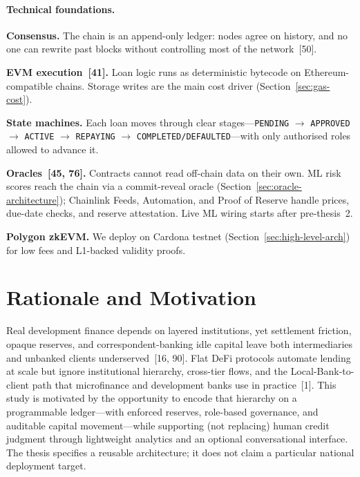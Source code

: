\documentclass[12pt, a4paper]{report}
\begin{document}
\paragraph{Technical foundations.}
\label{sec:blockchain-fundamentals}

\textbf{Consensus.} The chain is an append-only ledger: nodes agree on history, and no one can rewrite past blocks without controlling most of the network~[50].

\textbf{EVM execution~[41].} Loan logic runs as deterministic bytecode on Ethereum-compatible chains. Storage writes are the main cost driver (Section~\ref{sec:gas-cost}).

\textbf{State machines.} Each loan moves through clear stages---\texttt{PENDING} $\to$ \texttt{APPROVED} $\to$ \texttt{ACTIVE} $\to$ \texttt{REPAYING} $\to$ \texttt{COMPLETED/DEFAULTED}---with only authorised roles allowed to advance it.

\textbf{Oracles~[45, 76].} Contracts cannot read off-chain data on their own. ML risk scores reach the chain via a commit-reveal oracle (Section~\ref{sec:oracle-architecture}); Chainlink Feeds, Automation, and Proof of Reserve handle prices, due-date checks, and reserve attestation. Live ML wiring starts after pre-thesis~2.

\textbf{Polygon zkEVM.} We deploy on Cardona testnet (Section~\ref{sec:high-level-arch}) for low fees and L1-backed validity proofs.

\section{Rationale and Motivation}
\label{sec:rationale}

Real development finance depends on layered institutions, yet settlement friction, opaque reserves, and correspondent-banking idle capital leave both intermediaries and unbanked clients underserved~[16, 90]. Flat DeFi protocols automate lending at scale but ignore institutional hierarchy, cross-tier flows, and the Local-Bank-to-client path that microfinance and development banks use in practice~[1]. This study is motivated by the opportunity to encode that hierarchy on a programmable ledger---with enforced reserves, role-based governance, and auditable capital movement---while supporting (not replacing) human credit judgment through lightweight analytics and an optional conversational interface. The thesis specifies a reusable architecture; it does not claim a particular national deployment target.
\end{document}
